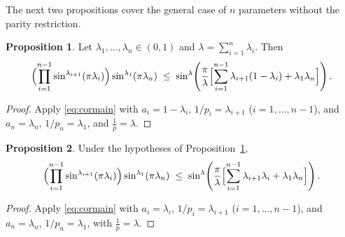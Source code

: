 \documentclass[12pt]{amsart}
\theoremstyle{definition}
\newtheorem{proposition}{Proposition}[section]
\begin{document}
The next two propositions cover the general case of $n$ parameters without the parity restriction.  

\begin{proposition}\label{prop:main3}
Let $\lambda_1,\ldots,\lambda_n\in(0,1)$ and
$\lambda=\displaystyle\sum_{i=1}^n\lambda_i$.  Then
\begin{equation}\label{eq:propmain3}
  \Bigl(\prod_{i=1}^{n-1}\sin^{\lambda_{i+1}}(\pi\lambda_i)\Bigr)
  \sin^{\lambda_1}(\pi\lambda_n)
  \;\leq\;
  \sin^\lambda\!\left(\frac\pi\lambda
  \Bigl[\sum_{i=1}^{n-1}\lambda_{i+1}(1-\lambda_i)+\lambda_1\lambda_n
  \Bigr]\right).
\end{equation}
\end{proposition}

\begin{proof}
Apply \eqref{eq:cormain} with $a_i=1-\lambda_i$,
$1/p_i=\lambda_{i+1}$ ($i=1,\ldots,n-1$), and
$a_n=\lambda_n$, $1/p_n=\lambda_1$, and $\frac{1}{p}=\lambda$.
\end{proof}

\begin{proposition}\label{prop:main4}
Under the hypotheses of Proposition~\ref{prop:main3},
\begin{equation}\label{eq:propmain4}
  \Bigl(\prod_{i=1}^{n-1}\sin^{\lambda_{i+1}}(\pi\lambda_i)\Bigr)
  \sin^{\lambda_1}(\pi\lambda_n)
  \;\leq\;
  \sin^\lambda\!\left(\frac\pi\lambda
  \Bigl[\sum_{i=1}^{n-1}\lambda_{i+1}\lambda_i+\lambda_1\lambda_n
  \Bigr]\right).
\end{equation}
\end{proposition}

\begin{proof}
Apply \eqref{eq:cormain} with $a_i=\lambda_i$,
$1/p_i=\lambda_{i+1}$ ($i=1,\ldots,n-1$), and
$a_n=\lambda_n$, $1/p_n=\lambda_1$, with $\frac{1}{p}=\lambda$.
\end{proof}
\end{document}
